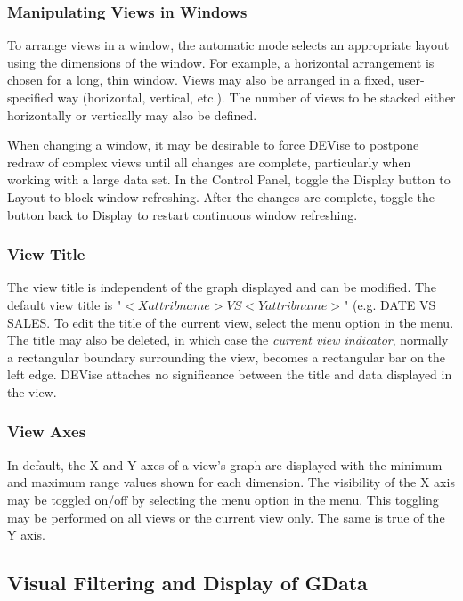 \subsubsection{Manipulating Views in Windows}

To arrange views in a window, the automatic mode selects an appropriate layout
using the dimensions of the window. For example, a horizontal arrangement is
chosen for a long, thin window. Views may also be arranged in a fixed,
user-specified way (horizontal, vertical, etc.). The number of views to be
stacked either horizontally or vertically may also be defined.

When changing a window, it may be desirable to force DEVise to postpone redraw
of complex views until all changes are complete, particularly when working with
a large data set. In the Control Panel, toggle the Display button to Layout
to block window refreshing. After the changes are complete, toggle the button
back to Display to restart continuous window refreshing.

\subsubsection{View Title}

The view title is independent of the graph displayed and can be modified. The
default view title is "$<X attrib name> VS <Y attrib name>$" (e.g. DATE VS
SALES. To edit the title of the current view, select the  menu
option in the  menu. The title may also be deleted, in which case the
{\em current view indicator}, normally a rectangular boundary surrounding the
view, becomes a rectangular bar on the left edge. DEVise attaches no
significance between the title and data displayed in the view.

\subsubsection{View Axes}

In default, the X and Y axes of a view's graph are displayed with the minimum
and maximum range values shown for each dimension. The visibility of the X axis
may be toggled on/off by selecting the  menu option in the
 menu. This toggling may be performed on all views or the current
view only. The same is true of the Y axis.

\subsection{Visual Filtering and Display of GData}

